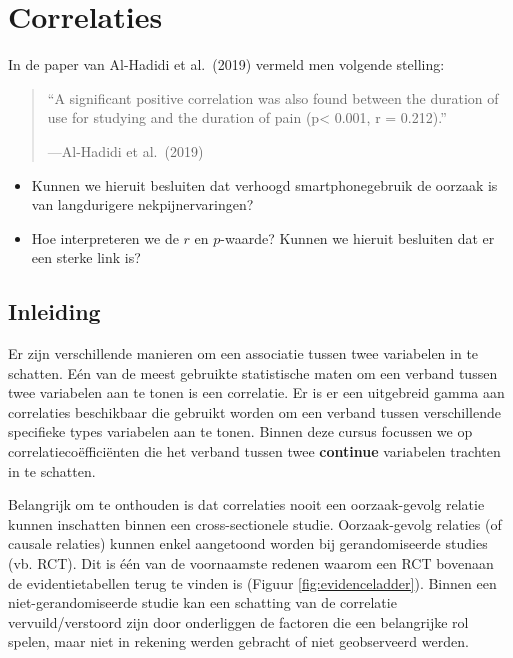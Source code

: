 \documentclass[
]{book}
\providecommand{\tightlist}{%
  \setlength{\itemsep}{0pt}\setlength{\parskip}{0pt}}
\theoremstyle{definition}
\theoremstyle{definition}
\theoremstyle{definition}
\theoremstyle{definition}
\theoremstyle{remark}
\begin{document}
\mainmatter

\hypertarget{corr}{%
\chapter{Correlaties}\label{corr}}

In de paper van Al-Hadidi et al.~(2019) vermeld men volgende stelling:

\begin{quote}
``A significant positive correlation was also found between the duration of use for studying and the duration of pain (p\textless{} 0.001, r = 0.212).''

---Al-Hadidi et al.~(2019)
\end{quote}

\begin{itemize}
\tightlist
\item
  Kunnen we hieruit besluiten dat verhoogd smartphonegebruik de oorzaak is van langdurigere nekpijnervaringen?
\item
  Hoe interpreteren we de \(r\) en \(p\)-waarde? Kunnen we hieruit besluiten dat er een sterke link is?
\end{itemize}

\hypertarget{inleiding}{%
\section*{Inleiding}\label{inleiding}}


Er zijn verschillende manieren om een associatie tussen twee variabelen in te schatten. Eén van de meest gebruikte statistische maten om een verband tussen twee variabelen aan te tonen is een correlatie. Er is er een uitgebreid gamma aan correlaties beschikbaar die gebruikt worden om een verband tussen verschillende specifieke types variabelen aan te tonen. Binnen deze cursus focussen we op correlatiecoëfficiënten die het verband tussen twee \textbf{continue} variabelen trachten in te schatten.

Belangrijk om te onthouden is dat correlaties nooit een oorzaak-gevolg relatie kunnen inschatten binnen een cross-sectionele studie. Oorzaak-gevolg relaties (of causale relaties) kunnen enkel aangetoond worden bij gerandomiseerde studies (vb. RCT). Dit is één van de voornaamste redenen waarom een RCT bovenaan de evidentietabellen terug te vinden is (Figuur \ref{fig:evidenceladder}). Binnen een niet-gerandomiseerde studie kan een schatting van de correlatie vervuild/verstoord zijn door onderliggen de factoren die een belangrijke rol spelen, maar niet in rekening werden gebracht of niet geobserveerd werden.
\end{document}
